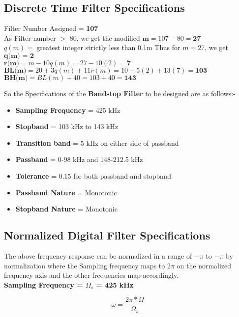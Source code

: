 \documentclass[12pt]{article}
\begin{document}
\subsection{Discrete Time Filter Specifications}

Filter Number Assigned = \textbf{107}\\
As Filter number $>$ 80, we get the modified $\textbf{m} = 107 - 80 = \textbf{27}$\\
$q(m) =$ greatest integer strictly less than 0.1m
Thus for $m = 27$, we get $\textbf{q(m) = 2}$\\
$\textbf{r(m)} = m - 10q(m) = 27 - 10(2) = \textbf{7}$\\
$\textbf{BL(m)} = 20 + 3q(m) + 11r(m) = 10 + 5(2) + 13(7) = \textbf{103}$\\
$\textbf{BH(m)} = BL(m) + 40 = 103 + 40 = \textbf{143}$\\
\par

\noindent So the Specifications of the \textbf{Bandstop Filter} to be designed are as follows:-

\begin{itemize}
    \item \textbf{Sampling Frequency} = 425 kHz
    \item \textbf{Stopband} = 103 kHz to 143 kHz
    \item \textbf{Transition band} = 5 kHz on either side of passband
    \item \textbf{Passband} = 0-98 kHz and 148-212.5 kHz
    \item \textbf{Tolerance} = 0.15 for both passband and stopband
    \item \textbf{Passband Nature} = Monotonic
    \item \textbf{Stopband Nature} = Monotonic
\end{itemize}
\newpage

\subsection{Normalized Digital Filter Specifications}
The above frequency response can be normalized in a range of $-\pi$ to $-\pi$ by normalization where the Sampling frequency maps to 2$\pi$ on the normalized frequency axis and the other frequencies map accordingly.\\
\textbf{Sampling Frequency = $\Omega_{s}$ = 425 kHz}

\[\omega = \frac{2\pi*\Omega}{\Omega_{s}}\]
\end{document}
